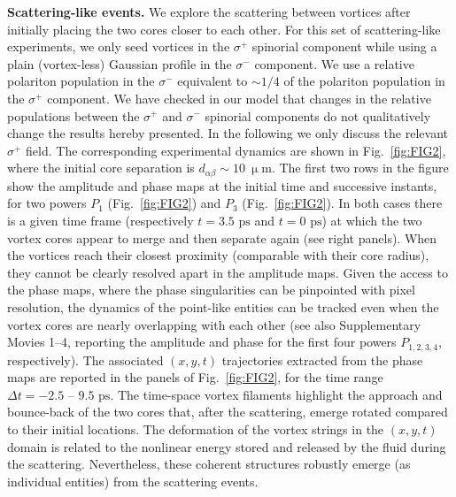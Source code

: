 \documentclass[aps,prb,twocolumn,superscriptaddress,nofootinbib]{revtex4}
\def\editr#1{#1}
\def\edstrike#1{}
\begin{document}
\noindent \textbf{Scattering-like events.}
We explore the scattering between vortices \editr{after} initially placing the
two cores closer to each other. \editr{For this set of
scattering-like experiments, we only seed vortices in the
$\sigma^+$ spinorial component while using a plain (vortex-less)
Gaussian profile in the $\sigma^-$ component. We use a relative
polariton population in the $\sigma^-$ equivalent to $\sim1/4$
of the polariton population in the $\sigma^+$ component.
We have checked in our model that changes in the relative populations
between the $\sigma^+$ and $\sigma^-$ spinorial components do not
qualitatively change the results hereby presented.
In the following we only discuss the relevant $\sigma^+$ field.}
%
The corresponding experimental dynamics are
shown in Fig.~\ref{fig:FIG2},
where the initial core separation is $d_{\alpha\beta}\sim 10~\upmu\text{m}$.
%
The first two rows in the figure show the amplitude and phase maps at the initial time
and successive instants, for two powers $P_1$ (Fig.~\ref{fig:FIG2}) and
$P_3$ (Fig.~\ref{fig:FIG2}). In both cases there is a given time frame
(respectively $t=3.5\text{ ps}$ and $t=0\text{ ps}$\edstrike{, see middle panels})
at which the two vortex cores appear to merge and then separate again (see right panels).
%
When the vortices reach their closest proximity (comparable with their core radius),
they cannot be clearly resolved apart in the amplitude maps.
%
Given the access to the phase maps, where the phase singularities can be pinpointed
with pixel resolution, the dynamics of the point-like entities can be tracked even
when the vortex cores are nearly overlapping with each other
(see also \editr{Supplementary Movies 1--4}, reporting the amplitude and phase
for the first four powers $P_{1,2,3,4}$, respectively).
The associated $(x,y,t)$ trajectories extracted from the phase maps are reported
in the panels of Fig.~\ref{fig:FIG2},
for the time range $\Delta t=-2.5 \text{ -- } 9.5\text{ ps}$.
%
The time-space vortex filaments highlight the approach and bounce-back
of the two cores that, after the scattering, emerge rotated compared
to their initial locations.
%
The deformation of the vortex strings in the $(x,y,t)$ domain
is related to the nonlinear energy stored and released by the fluid
during the scattering. Nevertheless, these coherent structures
robustly emerge (as individual entities)
from the scattering events.
\end{document}
